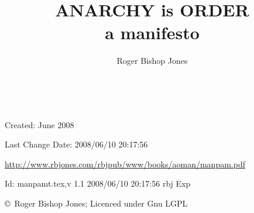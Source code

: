 \documentclass[10pt,a4paper.titlepage,openany,twocolumn]{article}
\author{Roger Bishop Jones}
\title{ANARCHY is ORDER\\a manifesto}
\date{\ }
\begin{document}
\begin{titlepage}
\maketitle
\begin{abstract}
\end{abstract}

\vfill

\begin{centering}

{\footnotesize

Created: June 2008

Last Change $ $Date: 2008/06/10 20:17:56 $ $

\href{http://www.rbjones.com/rbjpub/www/books/aoman/manpam.pdf}
{http://www.rbjones.com/rbjpub/www/books/aoman/manpam.pdf}

$ $Id: manpamt.tex,v 1.1 2008/06/10 20:17:56 rbj Exp $ $

\copyright\ Roger Bishop Jones; Licenced under Gnu LGPL

}%

\end{centering}

\thispagestyle{empty}
\end{titlepage}

{\parskip=0pt\tableofcontents}
\end{document}
